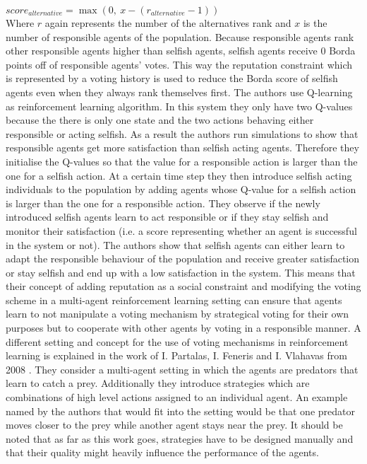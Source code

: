 \documentclass[conference]{IEEEtran}
\begin{document}
$score_{alternative}=\max(0,\ x-(r_{alternative}-1))$\\
Where $r$ again represents the number of the alternatives rank and $x$ is the number of responsible agents of the population. Because responsible agents rank other responsible agents higher than selfish agents, selfish agents receive $0$ Borda points off of responsible agents' votes. This way the reputation constraint which is represented by a voting history is used to reduce the Borda score of selfish agents even when they always rank themselves first.
\newline
The authors use Q-learning as reinforcement learning algorithm. In this system they only have two Q-values because the there is only one state and the two actions behaving either responsible or acting selfish.
As a result the authors run simulations to show that responsible agents get more satisfaction than selfish acting agents. Therefore they initialise the Q-values so that the value for a responsible action is larger than the one for a selfish action. At a certain time step they then introduce selfish acting individuals to the population by adding agents whose Q-value for a selfish action is larger than the one for a responsible action. They observe if the newly introduced selfish agents learn to act responsible or if they stay selfish and monitor their satisfaction (i.e. a score representing whether an agent is successful in the system or not).
\newline
The authors show that selfish agents can either learn to adapt the responsible behaviour of the population and receive greater satisfaction or stay selfish and end up with a low satisfaction in the system. This means that their concept of adding reputation as a social constraint and modifying the voting scheme in a multi-agent reinforcement learning setting can ensure that agents learn to not manipulate a voting mechanism by strategical voting for their own purposes but to cooperate with other agents by voting in a responsible manner.
\newline
\newline
A different setting and concept for the use of voting mechanisms in reinforcement learning is explained in the work of I. Partalas, I. Feneris and I. Vlahavas from 2008 \cite{partalas2008hybrid}. They consider a multi-agent setting in which the agents are predators that learn to catch a prey.
\newline
Additionally they introduce strategies which are combinations of high level actions assigned to an individual agent. An example named by the authors that would fit into the setting would be that one predator moves closer to the prey while another agent stays near the prey. It should be noted that as far as this work goes, strategies have to be designed manually and that their quality might heavily influence the performance of the agents.
\end{document}
